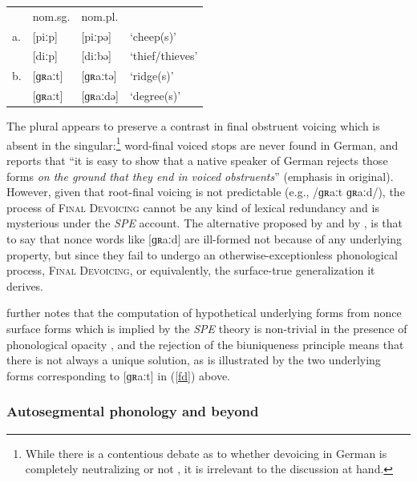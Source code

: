 \begin{example} 
\label{fd}
\begin{tabular}{l l l l}
   & nom.sg. & nom.pl.    \\
a. & [piːp]    & [piːpə]  & `cheep(s)'      \\
   & [diːp]    & [diːbə]  & `thief/thieves' \\
b. & [ɡʀaːt]   & [ɡʀaːtə] & `ridge(s)'      \\
   & [ɡʀaːt]   & [ɡʀaːdə] & `degree(s)'     \\
\end{tabular}
\end{example}

\noindent The plural appears to preserve a contrast in final obstruent voicing which is absent in the singular:\footnote{While there is a contentious debate as to whether devoicing in German is completely neutralizing \citep[e.g.,][]{Fourakis1984} or not \citep[e.g.,][]{Port1985}, it is irrelevant to the discussion at hand.} word-final voiced stops are never found in German, and \citet[95]{Shibatani1973} reports that ``it is easy to show that a native speaker of German rejects those forms \emph{on the ground that they end in voiced obstruents}'' (emphasis in original). However, given that root-final voicing is not predictable (e.g., /ɡʀaːt \alt{} ɡʀaːd/), the process of \textsc{Final Devoicing} cannot be any kind of lexical redundancy and is mysterious under the \emph{SPE} account. The alternative proposed by \citeauthor{Shibatani1973} and by \citet{Clayton1976}, is that to say that nonce words like [ɡʀaːd] are ill-formed not because of any underlying property, but since they fail to undergo an otherwise-exceptionless phonological process, \textsc{Final Devoicing}, or equivalently, the surface-true generalization it derives.

\citet{Sommerstein1974} further notes that the computation of hypothetical underlying forms from nonce surface forms which is implied by the \emph{SPE} theory is non-trivial in the presence of phonological opacity \citep[see][528f.]{Anderson1988a}, and the rejection of the biuniqueness principle means that there is not always a unique solution, as is illustrated by the two underlying forms corresponding to [ɡʀaːt] in (\ref{fd}) above.

\subsubsection{Autosegmental phonology and beyond}

